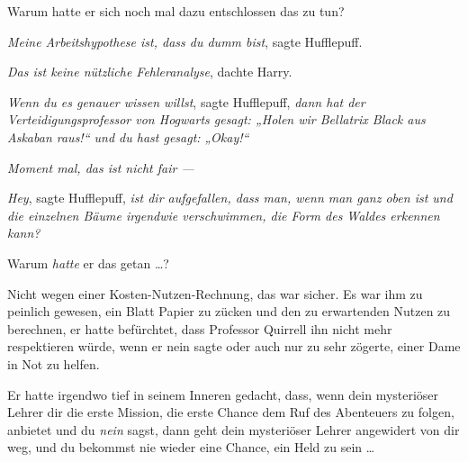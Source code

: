 Warum hatte er sich noch mal dazu entschlossen das zu tun?

\emph{Meine Arbeitshypothese ist, dass du dumm bist}, sagte Hufflepuff.

\emph{Das ist keine nützliche Fehleranalyse}, dachte Harry.

\emph{Wenn du es genauer wissen willst}, sagte Hufflepuff, \emph{dann hat der Verteidigungsprofessor von Hogwarts gesagt:
„Holen wir Bellatrix Black aus Askaban raus!“ und du hast gesagt:
„Okay!“}

\emph{Moment mal, das ist nicht fair —}

\emph{Hey}, sagte Hufflepuff, \emph{ist dir aufgefallen, dass man, wenn man ganz oben ist und die einzelnen Bäume irgendwie verschwimmen, die Form des Waldes erkennen kann?}

Warum \emph{hatte} er das getan …?

Nicht wegen einer Kosten-Nutzen-Rechnung, das war sicher. Es war ihm zu peinlich gewesen, ein Blatt Papier zu zücken und den zu erwartenden Nutzen zu berechnen, er hatte befürchtet, dass Professor Quirrell ihn nicht mehr respektieren würde, wenn er nein sagte oder auch nur zu sehr zögerte, einer Dame in Not zu helfen.

Er hatte irgendwo tief in seinem Inneren gedacht, dass, wenn dein mysteriöser Lehrer dir die erste Mission, die erste Chance dem Ruf des Abenteuers zu folgen, anbietet und du \emph{nein} sagst, dann geht dein mysteriöser Lehrer angewidert von dir weg, und du bekommst nie wieder eine Chance, ein Held zu sein …

